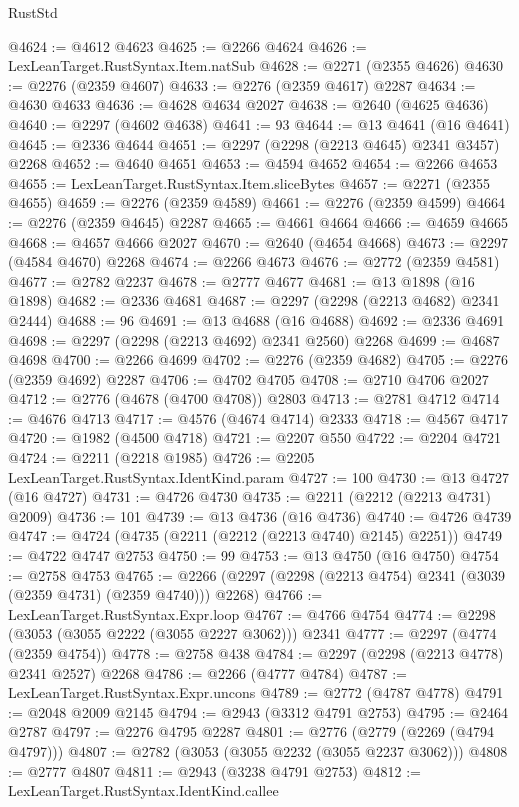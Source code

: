 \begin{lexlean}{RustStd}
\begin{coremodule}
@4624 := @4612 @4623
@4625 := @2266 @4624
@4626 := LexLeanTarget.RustSyntax.Item.natSub
@4628 := @2271 (@2355 @4626)
@4630 := @2276 (@2359 @4607)
@4633 := @2276 (@2359 @4617) @2287
@4634 := @4630 @4633
@4636 := @4628 @4634 @2027
@4638 := @2640 (@4625 @4636)
@4640 := @2297 (@4602 @4638)
@4641 := 93
@4644 := @13 @4641 (@16 @4641)
@4645 := @2336 @4644
@4651 := @2297 (@2298 (@2213 @4645) @2341 @3457) @2268
@4652 := @4640 @4651
@4653 := @4594 @4652
@4654 := @2266 @4653
@4655 := LexLeanTarget.RustSyntax.Item.sliceBytes
@4657 := @2271 (@2355 @4655)
@4659 := @2276 (@2359 @4589)
@4661 := @2276 (@2359 @4599)
@4664 := @2276 (@2359 @4645) @2287
@4665 := @4661 @4664
@4666 := @4659 @4665
@4668 := @4657 @4666 @2027
@4670 := @2640 (@4654 @4668)
@4673 := @2297 (@4584 @4670) @2268
@4674 := @2266 @4673
@4676 := @2772 (@2359 @4581)
@4677 := @2782 @2237
@4678 := @2777 @4677
@4681 := @13 @1898 (@16 @1898)
@4682 := @2336 @4681
@4687 := @2297 (@2298 (@2213 @4682) @2341 @2444)
@4688 := 96
@4691 := @13 @4688 (@16 @4688)
@4692 := @2336 @4691
@4698 := @2297 (@2298 (@2213 @4692) @2341 @2560) @2268
@4699 := @4687 @4698
@4700 := @2266 @4699
@4702 := @2276 (@2359 @4682)
@4705 := @2276 (@2359 @4692) @2287
@4706 := @4702 @4705
@4708 := @2710 @4706 @2027
@4712 := @2776 (@4678 (@4700 @4708)) @2803
@4713 := @2781 @4712
@4714 := @4676 @4713
@4717 := @4576 (@4674 @4714) @2333
@4718 := @4567 @4717
@4720 := @1982 (@4500 @4718)
@4721 := @2207 @550
@4722 := @2204 @4721
@4724 := @2211 (@2218 @1985)
@4726 := @2205 LexLeanTarget.RustSyntax.IdentKind.param
@4727 := 100
@4730 := @13 @4727 (@16 @4727)
@4731 := @4726 @4730
@4735 := @2211 (@2212 (@2213 @4731) @2009)
@4736 := 101
@4739 := @13 @4736 (@16 @4736)
@4740 := @4726 @4739
@4747 := @4724 (@4735 (@2211 (@2212 (@2213 @4740) @2145) @2251))
@4749 := @4722 @4747 @2753
@4750 := 99
@4753 := @13 @4750 (@16 @4750)
@4754 := @2758 @4753
@4765 := @2266 (@2297 (@2298 (@2213 @4754) @2341 (@3039 (@2359 @4731) (@2359 @4740))) @2268)
@4766 := LexLeanTarget.RustSyntax.Expr.loop
@4767 := @4766 @4754
@4774 := @2298 (@3053 (@3055 @2222 (@3055 @2227 @3062))) @2341
@4777 := @2297 (@4774 (@2359 @4754))
@4778 := @2758 @438
@4784 := @2297 (@2298 (@2213 @4778) @2341 @2527) @2268
@4786 := @2266 (@4777 @4784)
@4787 := LexLeanTarget.RustSyntax.Expr.uncons
@4789 := @2772 (@4787 @4778)
@4791 := @2048 @2009 @2145
@4794 := @2943 (@3312 @4791 @2753)
@4795 := @2464 @2787
@4797 := @2276 @4795 @2287
@4801 := @2776 (@2779 (@2269 (@4794 @4797)))
@4807 := @2782 (@3053 (@3055 @2232 (@3055 @2237 @3062)))
@4808 := @2777 @4807
@4811 := @2943 (@3238 @4791 @2753)
@4812 := LexLeanTarget.RustSyntax.IdentKind.callee

\end{coremodule}
\end{lexlean}
